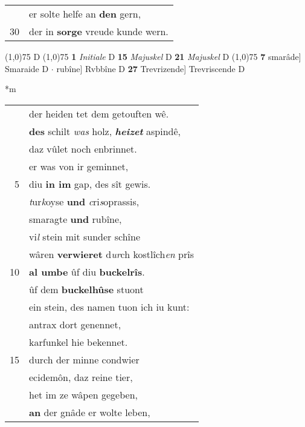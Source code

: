 \documentclass[8pt,a4paper,notitlepage]{article}
\begin{document}
\begin{table}[ht]
\begin{minipage}[t]{0.5\linewidth}
\begin{tabular}{rl}
 & er solte helfe an \textbf{den} gern,\\ 
30 & der in \textbf{sorge} vreude kunde wern.\\ 
\end{tabular}
\scriptsize
\line(1,0){75} \newline
D \newline
\line(1,0){75} \newline
\textbf{1} \textit{Initiale} D  \textbf{15} \textit{Majuskel} D  \textbf{21} \textit{Majuskel} D  \newline
\line(1,0){75} \newline
\textbf{7} smarâde] Smaraide D  $\cdot$ rubîne] Rvbbîne D \textbf{27} Trevrizende] Trevriscende D \newline
\end{minipage}
\hspace{0.5cm}
\begin{minipage}[t]{0.5\linewidth}
\small
\begin{center}*m
\end{center}
\begin{tabular}{rl}
 & der heiden tet dem getouften wê.\\ 
 & \textbf{des} schilt \textit{was} holz, \textbf{\textit{heizet}} aspindê,\\ 
 & daz vûlet noch enbrinnet.\\ 
 & er was von ir geminnet,\\ 
5 & diu \textbf{in im} gap, des sît gewis.\\ 
 & \textit{t}ur\textit{k}oyse \textbf{und} \textit{c}ri\textit{s}oprassis,\\ 
 & smaragte \textbf{und} rubîne,\\ 
 & vi\textit{l} stein mit sunder schîne\\ 
 & wâren \textbf{verwieret} d\textit{ur}ch kostlîch\textit{en} prîs\\ 
10 & \textbf{al umbe} ûf diu \textbf{buckelrîs}.\\ 
 & ûf dem \textbf{buckelhûse} stuont\\ 
 & ein stein, des namen tuon ich iu kunt:\\ 
 & antrax dort genennet,\\ 
 & karfunkel hie bekennet.\\ 
15 & durch der minne condwier\\ 
 & ecidemôn, daz reine tier,\\ 
 & het im ze wâpen gegeben,\\ 
 & \textbf{an} der gnâde er wolte leben,\\ 

\end{tabular}
\end{minipage}
\end{table}
\end{document}
